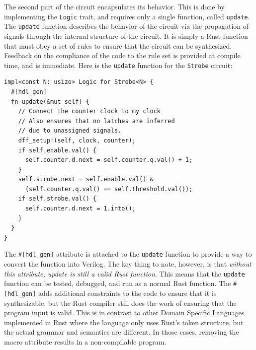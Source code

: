 \documentclass[conference]{IEEEtran}
\begin{document}
The second part of the circuit encapsulates its behavior.  This is done by implementing the \verb|Logic| trait,
and requires only a single function, called \verb|update|.  The \verb|update| function describes the behavior
of the circuit via the propagation of signals through the internal structure of the circuit.  It is simply a Rust function
that must obey a set of rules to ensure that the circuit can be synthesized.  Feedback on the compliance of the
code to the rule set is provided at compile time, and is immediate.  Here is the \verb|update| function for
the \verb|Strobe| circuit:

\begin{verbatim}
impl<const N: usize> Logic for Strobe<N> {
  #[hdl_gen]
  fn update(&mut self) {
    // Connect the counter clock to my clock
    // Also ensures that no latches are inferred
    // due to unassigned signals.
    dff_setup!(self, clock, counter);
    if self.enable.val() {
      self.counter.d.next = self.counter.q.val() + 1;
    }
    self.strobe.next = self.enable.val() & 
      (self.counter.q.val() == self.threshold.val());
    if self.strobe.val() {
      self.counter.d.next = 1.into();
    }
  }
}
\end{verbatim}

The \verb|#[hdl_gen]| attribute is attached to the \verb|update| function to provide a way to convert the function
into Verilog.  The key thing to note, however, is that \emph{without this attribute, update is still a valid Rust function}.
This means that the \verb|update| function can be tested, debugged, and run as a normal Rust function.  The \verb|#[hdl_gen]| adds
additional constraints to the code to ensure that it is synthesizable, but the Rust compiler still does the work of ensuring that the 
program input is valid.  This is in contrast to other Domain Specific Languages implemented in Rust where the 
language only uses Rust's token structure, but the actual grammar and semantics are different.  In those cases, removing the 
macro attribute results in a non-compilable program.
\end{document}
